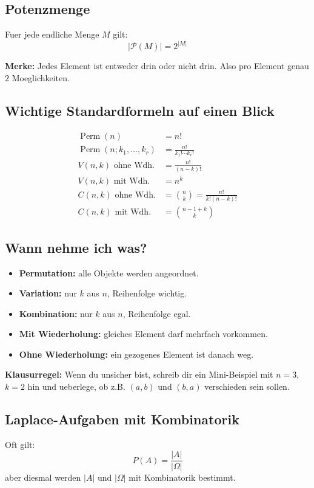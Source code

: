 \documentclass[a4paper,11pt]{article}
\begin{document}
\subsection{Potenzmenge}
Fuer jede endliche Menge $M$ gilt:
\[
|\mathcal{P}(M)| = 2^{|M|}
\]

\textbf{Merke:}
Jedes Element ist entweder drin oder nicht drin. Also pro Element genau $2$ Moeglichkeiten.

\subsection{Wichtige Standardformeln auf einen Blick}
\begin{align*}
\operatorname{Perm}(n) &= n! \\
\operatorname{Perm}(n;k_1,\dots,k_r) &= \frac{n!}{k_1!\cdots k_r!} \\
V(n,k) \text{ ohne Wdh.} &= \frac{n!}{(n-k)!} \\
V(n,k) \text{ mit Wdh.} &= n^k \\
C(n,k) \text{ ohne Wdh.} &= \binom{n}{k} = \frac{n!}{k!(n-k)!} \\
C(n,k) \text{ mit Wdh.} &= \binom{n-1+k}{k}
\end{align*}

\subsection{Wann nehme ich was?}
\begin{itemize}
  \item \textbf{Permutation:} alle Objekte werden angeordnet.
  \item \textbf{Variation:} nur $k$ aus $n$, Reihenfolge wichtig.
  \item \textbf{Kombination:} nur $k$ aus $n$, Reihenfolge egal.
  \item \textbf{Mit Wiederholung:} gleiches Element darf mehrfach vorkommen.
  \item \textbf{Ohne Wiederholung:} ein gezogenes Element ist danach weg.
\end{itemize}

\textbf{Klausurregel:}
Wenn du unsicher bist, schreib dir ein Mini-Beispiel mit $n=3$, $k=2$ hin und ueberlege, ob z.B. $(a,b)$ und $(b,a)$ verschieden sein sollen.

\subsection{Laplace-Aufgaben mit Kombinatorik}
Oft gilt:
\[
P(A) = \frac{|A|}{|\Omega|}
\]
aber diesmal werden $|A|$ und $|\Omega|$ mit Kombinatorik bestimmt.
\end{document}

